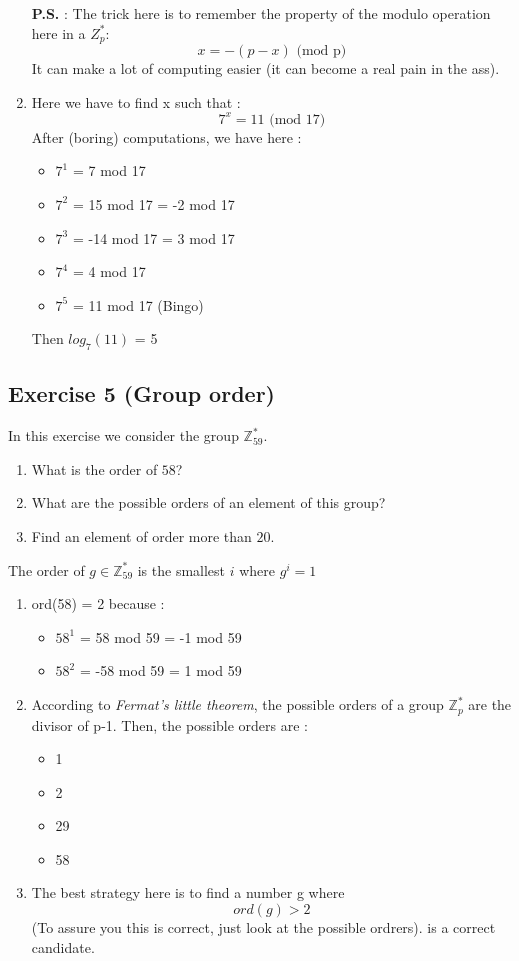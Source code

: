 \begin{solution}
\begin{enumerate}
    \textbf{P.S.} : The trick here is to remember the property of the modulo operation here in a $Z^*_p$:
    $$ x = -(p - x) \text{ (mod p)} $$  
    It can make a lot of computing easier (it can become a real pain in the ass).
    \item Here we have to find x such that : 
    $$ 7^x = 11 \text{ (mod 17)} $$
    After (boring) computations, we have here :
    \begin{itemize}
        \item $7^1$ = 7 mod 17
        \item $7^2$ = 15 mod 17 = -2 mod 17
        \item $7^3$ = -14 mod 17 = 3 mod 17
        \item $7^4$ = 4 mod 17
        \item $7^5$ = 11 mod 17 (Bingo)
    \end{itemize}
    Then $log_7(11)$ = 5
\end{enumerate}
\end{solution}

\subsection{Exercise 5 (Group order)}
In this exercise we consider the group $\mathbb{Z}_{59}^*$.

\begin{enumerate}
	\item What is the order of $58$?
	\item What are the possible orders of an element of this group?
	\item Find an element of order more than $20$.
	
\end{enumerate}
\begin{solution}
The order of $g \in \mathbb{Z}^*_{59}$ is the smallest $i$ where $g^i = 1$ 
\begin{enumerate}
    \item ord(58) = 2 because :
    \begin{itemize}
        \item  $58^1$ = 58 mod 59 = -1 mod 59
        \item  $58^2$ = -58 mod 59 = 1 mod 59
    \end{itemize}
    \item According to \textit{Fermat's little theorem}, the possible orders of a group $\mathbb{Z}^*_{p}$ are the divisor of p-1. Then, the possible orders are : 
    \begin{itemize}
        \item 1
        \item 2
        \item 29
        \item 58
    \end{itemize}
    \item The best strategy here is to find a number g where 
    $$ ord(g) > 2 $$
    (To assure you this is correct, just look at the possible ordrers).   is a correct candidate. 
\end{enumerate}
\end{solution}


